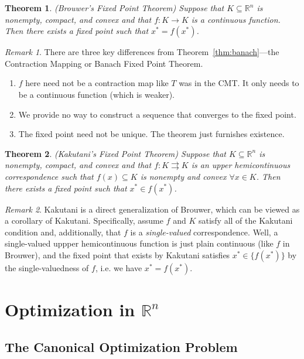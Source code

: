 \documentclass[12pt]{article}
\numberwithin{equation}{section} %
\theoremstyle{plain}
\newtheorem{thm}{Theorem}[section]
\theoremstyle{definition}
\theoremstyle{remark}
\newtheorem*{rmk}{Remark}
\newcommand{\Rn}{\mathbb{R}^n}
\begin{document}
\begin{thm}\emph{(Brouwer's Fixed Point Theorem)}
Suppose that $K\subseteq \Rn$ is nonempty, compact, and convex and that
$f:K\rightarrow K$ is a continuous function. Then there exists a fixed
point such that $x^*=f(x^*)$.
\end{thm}
\begin{rmk}
There are three key differences from Theorem~\ref{thm:banach}---the
Contraction Mapping or Banach Fixed Point Theorem.
\begin{enumerate}
  \item $f$ here need not be a contraction map like $T$ was in the CMT.
    It only needs to be a continuous function (which is weaker).
  \item We provide no way to construct a sequence that converges to the
    fixed point.
  \item The fixed point need not be unique. The theorem just furnishes
    existence.
\end{enumerate}
\end{rmk}

\begin{thm}\emph{(Kakutani's Fixed Point Theorem)}
Suppose that $K\subseteq \Rn$ is nonempty, compact, and convex and that
$f:K\rightrightarrows K$ is an upper hemicontinuous correspondence
such that $f(x)\subseteq K$ is nonempty and convex $\forall x\in K$.
Then there exists a fixed point such that $x^*\in f(x^*)$.
\end{thm}
\begin{rmk}
Kakutani is a direct generalization of Brouwer, which can be viewed as a
corollary of Kakutani. Specifically, assume $f$ and $K$ satisfy all of
the Kakutani condition and, additionally, that $f$ is a
\emph{single-valued} correspondence.  Well, a single-valued uppper
hemicontinuous function is just plain continuous (like $f$ in Brouwer),
and the fixed point that exists by Kakutani satisfies $x^*\in
\{f(x^*)\}$ by the single-valuedness of $f$, i.e. we have $x^*=f(x^*)$.
\end{rmk}



\clearpage
\section{Optimization in $\Rn$}

\subsection{The Canonical Optimization Problem}
\end{document}
